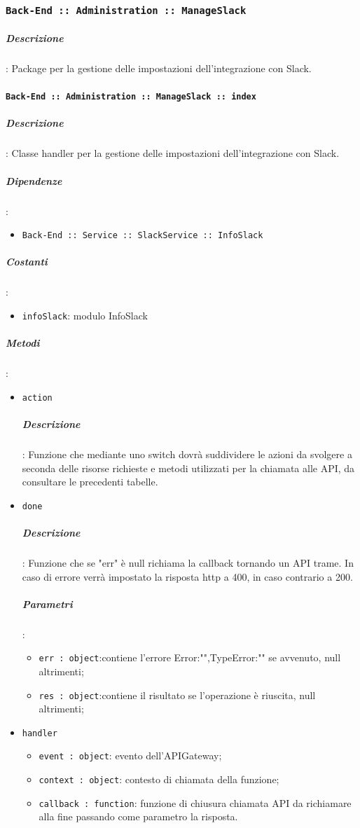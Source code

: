 \documentclass[../DefinizioneDiProdotto_v2.0.0.tex]{subfiles}
\begin{document}
\subsubsection{\texttt{Back-End :: Administration :: ManageSlack}}
\subparagraph{Descrizione}: Package per la gestione delle impostazioni dell'integrazione con Slack.

\paragraph{\texttt{Back-End :: Administration :: ManageSlack :: index}}
\subparagraph{Descrizione}: Classe handler per la gestione delle impostazioni dell'integrazione con Slack.
\subparagraph{Dipendenze}:
\begin{itemize}
	\item \texttt{Back-End :: Service :: SlackService :: InfoSlack}
\end{itemize}
\subparagraph{Costanti}:
\begin{itemize}
	\item \texttt{infoSlack}: modulo InfoSlack
\end{itemize}
\subparagraph{Metodi}:
\begin{itemize}
	\item \texttt{action}
	      \subparagraph{Descrizione}: Funzione che mediante uno switch dovrà suddividere le azioni da svolgere a seconda delle risorse richieste e metodi utilizzati per la chiamata alle API, da consultare le precedenti tabelle.
	\item \texttt{done}
	      \subparagraph{Descrizione}: Funzione che se "err" è null richiama la callback tornando un API trame. In caso di errore verrà impostato la risposta http a 400, in caso contrario a 200.
	      \subparagraph{Parametri}:
	      \begin{itemize}
	      	\item \texttt{err : object}:contiene l'errore {Error:"",TypeError:""} se avvenuto, null altrimenti;
	      	\item \texttt{res : object}:contiene il risultato se l'operazione è riuscita, null altrimenti;
	      \end{itemize}
	\item \texttt{handler}
	      \begin{itemize}
	      	\item \texttt{event : object}: evento dell'APIGateway;
	      	\item \texttt{context : object}: contesto di chiamata della funzione;
	      	\item \texttt{callback : function}: funzione di chiusura chiamata API da richiamare alla fine passando come parametro la risposta.
	      \end{itemize}
\end{itemize}
\end{document}
